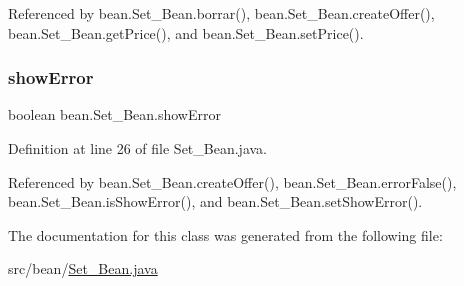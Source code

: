 Referenced by bean.\+Set\+\_\+\+Bean.\+borrar(), bean.\+Set\+\_\+\+Bean.\+create\+Offer(), bean.\+Set\+\_\+\+Bean.\+get\+Price(), and bean.\+Set\+\_\+\+Bean.\+set\+Price().

\mbox{\label{classbean_1_1Set__Bean_a1476ea0d0fa314e92ff99f9a9499e5c0}} 
\subsubsection{\texorpdfstring{showError}{showError}}
{\footnotesize\ttfamily boolean bean.\+Set\+\_\+\+Bean.\+show\+Error\hspace{0.3cm}{\ttfamily [package]}}



Definition at line 26 of file Set\+\_\+\+Bean.\+java.



Referenced by bean.\+Set\+\_\+\+Bean.\+create\+Offer(), bean.\+Set\+\_\+\+Bean.\+error\+False(), bean.\+Set\+\_\+\+Bean.\+is\+Show\+Error(), and bean.\+Set\+\_\+\+Bean.\+set\+Show\+Error().



The documentation for this class was generated from the following file\+:\begin{DoxyCompactItemize}
\item 
src/bean/\mbox{\hyperlink{Set__Bean_8java}{Set\+\_\+\+Bean.\+java}}\end{DoxyCompactItemize}
